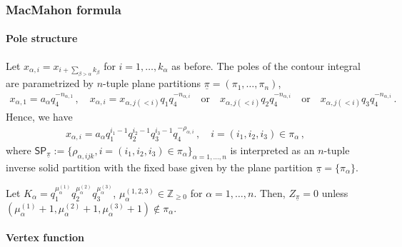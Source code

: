 \subsubsection{MacMahon formula}

\paragraph{Pole structure}
Let $x_{\alpha,i} = x_{i+\sum_{\beta > \alpha}k_\beta}$ for $i = 1,\ldots, k_\alpha$ as before.
The poles of the contour integral are parametrized by $n$-tuple plane partitions $\underline{\pi} = (\pi_1,\ldots,\pi_n)$,
\begin{align}
 x_{\alpha,1} = a_\alpha q_4^{-n_{\alpha,1}} 
 \, , \quad 
 x_{\alpha,i} = 
 x_{\alpha,j(<i)} q_{1} q_4^{-n_{\alpha,i}} 
 \quad \text{or} \quad 
 x_{\alpha,j(<i)} q_{2} q_4^{-n_{\alpha,i}} 
  \quad \text{or} \quad 
 x_{\alpha,j(<i)} q_{3} q_4^{-n_{\alpha,i}} 
 \, .
\end{align} 
Hence, we have
\begin{align}
 x_{\alpha,i} = a_\alpha q_1^{i_1-1} q_2^{i_2-1} q_3^{i_3-1} q_4^{-\rho_{\alpha,i}} 
 \, , \quad 
 i = (i_1,i_2,i_3) \in \pi_\alpha \, ,
 \label{eq:poles_PT4one}
\end{align} 
where $\mathsf{SP}_{\underline{\pi}} := \{\rho_{\alpha,ijk}, i = (i_1,i_2,i_3) \in \pi_\alpha \}_{\alpha = 1,\ldots,n}$ is interpreted as an $n$-tuple inverse solid partition with the fixed base given by the plane partition $\underline{\pi} = \{\pi_\alpha\}$.


\begin{proposition}
    Let $K_\alpha = q_1^{\mu^{(1)}_{\alpha}} q_2^{\mu^{(2)}_\alpha} q_3^{\mu^{(3)}_\alpha}$, $\mu^{(1,2,3)}_\alpha \in \mathbb{Z}_{\ge 0}$ for $\alpha = 1,\ldots,n$.
    Then, $Z_{\underline{\pi}} = 0$ unless $(\mu^{(1)}_\alpha + 1,\mu^{(2)}_\alpha + 1,\mu^{(3)}_\alpha + 1) \not\in \pi_\alpha$.
\end{proposition}

\paragraph{Vertex function}

